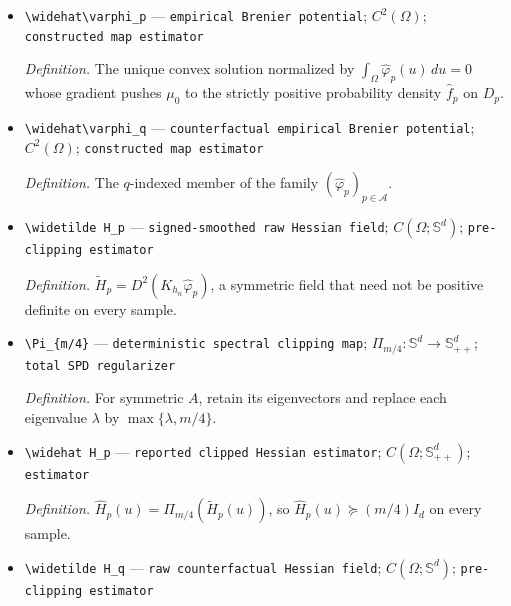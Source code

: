 \documentclass{article}
\begin{document}
\begin{itemize}
  \par\smallskip\noindent\emph{Definition.} The measurable piecewise density \(\widehat f_p=\widetilde f_p\mathbf 1_{\mathcal E_{p,n}}+f_p^{\circ}\mathbf 1_{\mathcal E_{p,n}^{\mathsf c}}\).
  \item \texttt{\textbackslash{}\allowbreak{}widehat\textbackslash{}\allowbreak{}varphi\_\allowbreak{}p} --- \texttt{empirical Brenier potential}; \(C^2(\Omega)\); \texttt{constructed map estimator}
  \par\smallskip\noindent\emph{Definition.} The unique convex solution normalized by \(\int_{\Omega}\widehat\varphi_p(u)\,du=0\) whose gradient pushes \(\mu_0\) to the strictly positive probability density \(\widehat f_p\) on \(D_p\).
  \item \texttt{\textbackslash{}\allowbreak{}widehat\textbackslash{}\allowbreak{}varphi\_\allowbreak{}q} --- \texttt{counterfactual empirical Brenier potential}; \(C^2(\Omega)\); \texttt{constructed map estimator}
  \par\smallskip\noindent\emph{Definition.} The \(q\)-indexed member of the family \((\widehat\varphi_p)_{p\in\mathcal A}\).
  \item \texttt{\textbackslash{}\allowbreak{}widetilde H\_\allowbreak{}p} --- \texttt{signed-\allowbreak{}smoothed raw Hessian field}; \(C(\Omega;\mathbb S^d)\); \texttt{pre-\allowbreak{}clipping estimator}
  \par\smallskip\noindent\emph{Definition.} \(\widetilde H_p=D^2(K_{h_n}\widehat\varphi_p)\), a symmetric field that need not be positive definite on every sample.
  \item \texttt{\textbackslash{}\allowbreak{}Pi\_\allowbreak{}\{m/\allowbreak{}4\}\allowbreak{}} --- \texttt{deterministic spectral clipping map}; \(\Pi_{m/4}:\mathbb S^d\to\mathbb S_{++}^d\); \texttt{total SPD regularizer}
  \par\smallskip\noindent\emph{Definition.} For symmetric \(A\), retain its eigenvectors and replace each eigenvalue \(\lambda\) by \(\max\{\lambda,m/4\}\).
  \item \texttt{\textbackslash{}\allowbreak{}widehat H\_\allowbreak{}p} --- \texttt{reported clipped Hessian estimator}; \(C(\Omega;\mathbb S_{++}^d)\); \texttt{estimator}
  \par\smallskip\noindent\emph{Definition.} \(\widehat H_p(u)=\Pi_{m/4}(\widetilde H_p(u))\), so \(\widehat H_p(u)\succeq(m/4)I_d\) on every sample.
  \item \texttt{\textbackslash{}\allowbreak{}widetilde H\_\allowbreak{}q} --- \texttt{raw counterfactual Hessian field}; \(C(\Omega;\mathbb S^d)\); \texttt{pre-\allowbreak{}clipping estimator}

\end{itemize}
\end{document}
